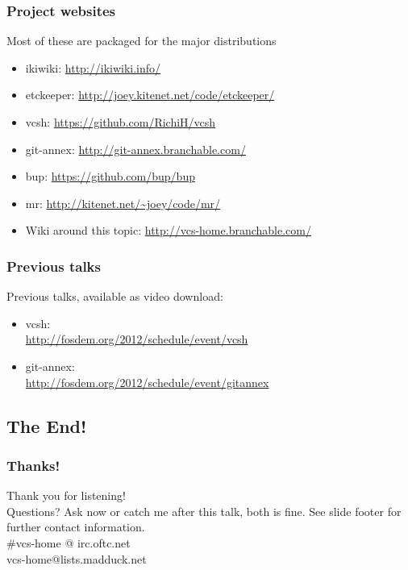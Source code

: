\documentclass[t]{beamer}
\begin{document}
\begin{frame}
	\frametitle{Project websites}
	Most of these are packaged for the major distributions
	\begin{itemize}
		\item ikiwiki: \url{http://ikiwiki.info/}
		\item etckeeper: \url{http://joey.kitenet.net/code/etckeeper/}
		\item vcsh: \url{https://github.com/RichiH/vcsh}
		\item git-annex: \url{http://git-annex.branchable.com/}
		\item bup: \url{https://github.com/bup/bup}
		\item mr: \url{http://kitenet.net/~joey/code/mr/}
		\item Wiki around this topic: \url{http://vcs-home.branchable.com/}
	\end{itemize}
\end{frame}

\begin{frame}
	\frametitle{Previous talks}
	Previous talks, available as video download:
	\begin{itemize}
		\item vcsh: \\
			\url{http://fosdem.org/2012/schedule/event/vcsh}
		\item git-annex: \\
			\url{http://fosdem.org/2012/schedule/event/gitannex}
	\end{itemize}
\end{frame}

\subsection{The End!}

\begin{frame}
	\frametitle{Thanks!}
		\begin{center}
			\vfill
			Thank you for listening!\\
			\vfill
			Questions? Ask now or catch me after this talk, both is fine.
			\vfill
			See slide footer for further contact information.\\
			\vfill
			\#vcs-home @ irc.oftc.net\\
			vcs-home@lists.madduck.net
			\vfill
		\end{center}
\end{frame}
\end{document}
